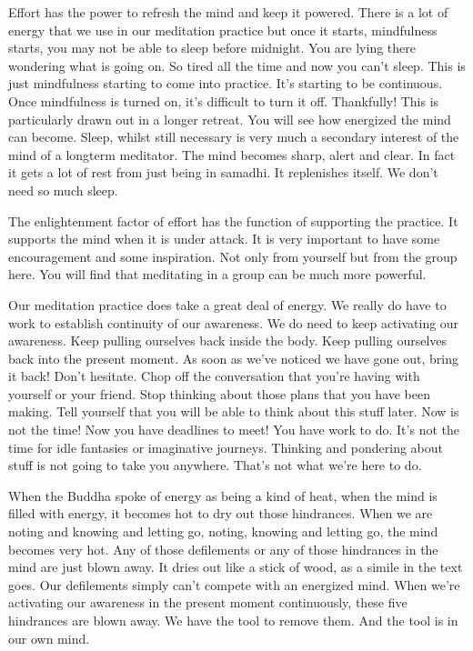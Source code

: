\documentclass[letterpaper,10pt,english]{sphinxmanual}
\begin{document}
\sphinxAtStartPar
Effort has the power to refresh the mind and keep it powered. There
is a lot of energy that we use in our meditation practice but once it starts,
mindfulness starts, you may not be able to sleep before midnight. You are
lying there wondering what is going on. So tired all the time and now you
can’t sleep. This is just mindfulness starting to come into practice. It’s starting   to be continuous. Once mindfulness is turned on, it’s difficult to turn it
off. Thankfully! This is particularly drawn out in a longer retreat. You will
see how energized the mind can become. Sleep, whilst still necessary is very
much a secondary interest of the mind of a long\sphinxhyphen{}term meditator. The mind
becomes sharp, alert and clear. In fact it gets a lot of rest from just being in
samadhi. It replenishes itself. We don’t need so much sleep.

\sphinxAtStartPar
The enlightenment factor of effort has the function of supporting the
practice. It supports the mind when it is under attack. It is very important to
have some encouragement and some inspiration. Not only from yourself but
from the group here. You will find that meditating in a group can be much
more powerful.

\sphinxAtStartPar
Our meditation practice does take a great deal of energy. We really do
have to work to establish continuity of our awareness. We do need to keep
activating our awareness. Keep pulling ourselves back inside the body. Keep
pulling ourselves back into the present moment. As soon as we’ve noticed
we have gone out, bring it back! Don’t hesitate. Chop off the conversation
that  you’re  having  with  yourself  or  your  friend.  Stop  thinking  about  those
plans that you have been making. Tell yourself that you will be able to think
about this stuff later. Now is not the time! Now you have deadlines to meet!
You have work to do. It’s not the time for idle fantasies or imaginative journeys. Thinking and pondering about stuff is not going to take you anywhere.
That’s not what we’re here to do.

\sphinxAtStartPar
When the Buddha spoke of energy as being a kind of heat, when the
mind is filled with energy, it becomes hot to dry out those hindrances. When
we are noting and knowing and letting go, noting, knowing and letting go,
the mind becomes very hot. Any of those defilements or any of those hindrances in the mind are just blown away. It dries out like a stick of wood, as
a simile in the text goes. Our defilements simply can’t compete with an energized  mind.  When  we’re  activating  our  awareness  in  the  present  moment
continuously,  these  five  hindrances  are  blown  away.  We  have  the  tool  to
remove them. And the tool is in our own mind.
\end{document}
